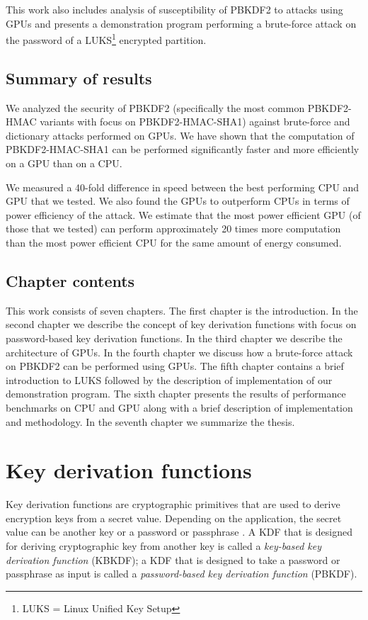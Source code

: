 \documentclass[12pt,oneside]{fithesis2}
\begin{document}
      This work also includes analysis of susceptibility of PBKDF2 to attacks using GPUs and presents a demonstration program performing a brute-force attack on the password of a LUKS\footnote{LUKS = Linux Unified Key Setup} encrypted partition.
    
      \section{Summary of results}
      We analyzed the security of PBKDF2 (specifically the most common PBKDF2-HMAC variants with focus on PBKDF2-HMAC-SHA1) against brute-force and dictionary attacks performed on GPUs. We have shown that the computation of PBKDF2-HMAC-SHA1 can be performed significantly faster and more efficiently on a GPU than on a CPU.
      
      We measured a 40-fold difference in speed between the best performing CPU and GPU that we tested. We also found the GPUs to outperform CPUs in terms of power efficiency of the attack. We estimate that the most power efficient GPU (of those that we tested) can perform approximately 20 times more computation than the most power efficient CPU for the same amount of energy consumed.
      
      \section{Chapter contents}
      This work consists of seven chapters. The first chapter is the introduction. In the second chapter we describe the concept of key derivation functions with focus on password-based key derivation functions. In the third chapter we describe the architecture of GPUs. In the fourth chapter we discuss how a brute-force attack on PBKDF2 can be performed using GPUs. The fifth chapter contains a brief introduction to LUKS followed by the description of implementation of our demonstration program. The sixth chapter presents the results of performance benchmarks on CPU and GPU along with a brief description of implementation and methodology. In the seventh chapter we summarize the thesis.
    
    \chapter{Key derivation functions}
      Key derivation functions are cryptographic primitives that are used to derive encryption keys from a secret value. Depending on the application, the secret value can be another key or a password or passphrase \cite{wiki:KDF}. A KDF that is designed for deriving cryptographic key from another key is called a \emph{key-based key derivation function} (KBKDF); a KDF that is designed to take a password or passphrase as input is called a \emph{password-based key derivation function} (PBKDF).
      
\end{document}
